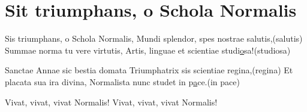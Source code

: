 \section{Sit triumphans, o Schola Normalis}
\subtitle{Sul “Salve invicta Juditha formosa” di A. Vivaldi}

\subtitle{Si ripete tutto due volte a gruppi di due versi, vivat esclusi}
\begin{canzone}
Sis triumphans, o Schola Normalis,
Mundi splendor, spes nostrae salutis,\hfill (salutis)
Summae norma tu vere virtutis,
Artis, linguae et scientiae studi\underline{o}sa!\hfill (studiosa)

Sanctae Annae sic bestia domata
Triumphatrix sis scientiae regina,\hfill (regina)
Et placata sua ira divina,
Normalista nunc studet in p\underline{a}ce.\hfill (in pace)

Vivat, vivat, vivat Normalis!
Vivat, vivat, vivat Normalis!
\end{canzone}
